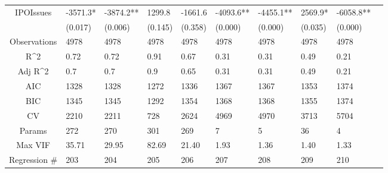 \documentclass{article}
\begin{document}
\begin{table}[H]
\begin{tabular}{|clllllllll|}
  IPOIssues & -3571.3* & -3874.2** & 1299.8 & -1661.6 & -4093.6** & -4455.1** & 2569.9* & -6058.8** & \\ 
   & (0.017) & (0.006) & (0.145) & (0.358) & (0.000) & (0.000) & (0.035) & (0.000) & \\ 
  \hline 
 Observations & 4978 & 4978 & 4978 & 4978 & 4978 & 4978 & 4978 & 4978 & \\ 
  R^2 & 0.72 & 0.72 & 0.91 & 0.67 & 0.31 & 0.31 & 0.49 & 0.21 & \\ 
  Adj R^2 & 0.7 & 0.7 & 0.9 & 0.65 & 0.31 & 0.31 & 0.49 & 0.21 & \\ 
  AIC & 1328 & 1328 & 1272 & 1336 & 1367 & 1367 & 1353 & 1374 & \\ 
  BIC & 1345 & 1345 & 1292 & 1354 & 1368 & 1368 & 1355 & 1374 & \\ 
  CV & 2210 & 2211 & 728 & 2624 & 4969 & 4970 & 3713 & 5704 & \\ 
  Params & 272 & 270 & 301 & 269 & 7 & 5 & 36 & 4 & \\ 
  Max VIF & 35.71 & 29.95 & 82.69 & 21.40 & 1.93 & 1.36 & 1.40 & 1.33 & \\ 
  Regression \# & 203 & 204 & 205 & 206 & 207 & 208 & 209 & 210 & \\ 
   \hline
\end{tabular}
 
\end{table}
\end{document}
